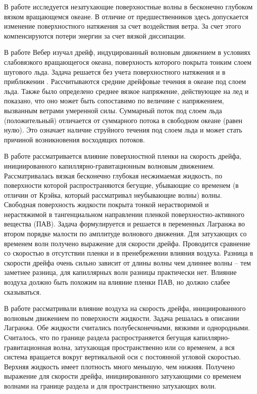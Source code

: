 В работе \cite{weber1983steady} исследуется незатухающие поверхностные волны в бесконечно глубоком вязком вращающемся океане. В отличие от предшественников здесь допускается изменение поверхностного натяжения за счет воздействия ветра. За счет этого компенсируются потери энергии за счет вязкой диссипации. 

В работе \cite{weber1987wave} Вебер изучал дрейф, индуцированный волновым движением в условиях слабовязкого вращающегося океана, поверхность которого покрыта тонким слоем шугового льда. Задача решается без учета поверхностного натяжения и в приближении  . Рассчитываются средние дрейфовые течения в океане под слоем льда. Также было определено среднее вязкое напряжение, действующее на лед и показано, что оно может быть сопоставимо по величине с напряжением, вызванным ветрами умеренной силы. 
Суммарный поток под слоем льда (положительный) отличается от суммарного потока в свободном океане (равен нулю). Это означает наличие струйного течения под слоем льда и может стать причиной возникновения восходящих потоков.

В работе \cite{weber1989effect} рассматривается влияние поверхностной пленки на скорость дрейфа, инициированного капиллярно-гравитационным волновым движением.
Рассматривалась вязкая бесконечно глубокая несжимаемая жидкость, по поверхности которой распространяются бегущие, убывающие со временем (в отличии от Крэйка, который рассматривал неубывающие волны) волны. Свободная поверхность жидкости покрыта тонкой нерастворимой и нерастяжимой в тангенциальном направлении пленкой поверхностно-активного вещества (ПАВ). Задача формулируется и решается в переменных Лагранжа во втором порядке малости по амплитуде волнового движения. 
Для затухающих со временем волн получено выражение для скорости дрейфа. Проводится сравнение со скоростью в отсутствии пленки и в пренебрежении влияния воздуха. Разница в скорости дрейфа очень сильно зависит от длины волны чем длиннее волны – тем заметнее разница, для капиллярных волн разницы практически нет. Влияние воздуха должно быть похожим на влияние пленки ПАВ, но должно слабее сказываться.

В работе \cite{weber1990effect} рассматривали влияние воздуха на скорость дрейфа, инициированного волновым движением по поверхности жидкости. Задача решалась в описании Лагранжа. Обе жидкости считались полубесконечными, вязкими и однородными. Считалось, что по границе раздела распространяется бегущая капиллярно-гравитационная волна, затухающая пространственно или со временем, а вся система вращается вокруг вертикальной оси с постоянной угловой скоростью. Верхняя жидкость имеет плотность много меньшую, чем нижняя. Получено выражение для скорости дрейфа, инициированного затухающими со временем волнами на границе раздела и для пространственно затухающих волн.

